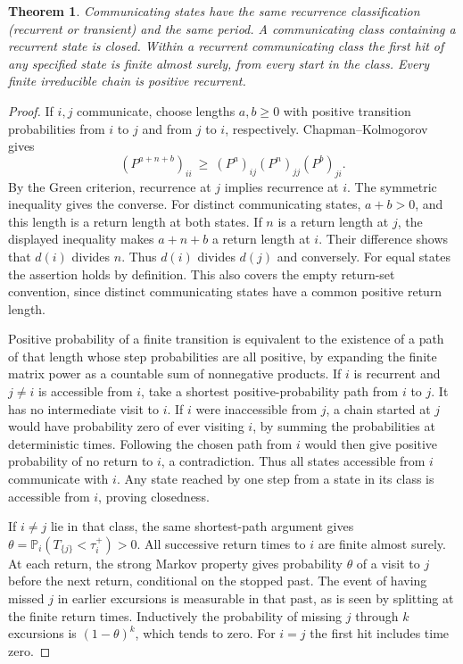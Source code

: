 \documentclass[11pt,oneside,openany]{book}
\theoremstyle{plain}
\newtheorem{theorem}{Theorem}[chapter]
\theoremstyle{definition}
\theoremstyle{remark}
\begin{document}
\begin{theorem}
Communicating states have the same recurrence classification
(recurrent or transient) and the same period. A communicating class
containing a recurrent state is closed. Within a recurrent
communicating class the first hit of any specified state is finite
almost surely, from every start in the class. Every finite
irreducible chain is positive recurrent.
\end{theorem}
\begin{proof}
If \(i,j\) communicate, choose lengths \(a,b\ge0\) with positive
transition probabilities from \(i\) to \(j\) and from \(j\) to \(i\),
respectively. Chapman--Kolmogorov gives
\[
 (P^{a+n+b})_{ii}\ \ge\ (P^a)_{ij}(P^n)_{jj}(P^b)_{ji}.
\]
By the Green criterion, recurrence at \(j\) implies recurrence at
\(i\). The symmetric inequality gives the converse.
For distinct communicating states, \(a+b>0\), and this length is
a return length at both states. If \(n\) is a return length at \(j\),
the displayed inequality makes \(a+n+b\) a return length at \(i\).
Their difference shows that \(d(i)\) divides \(n\). Thus \(d(i)\)
divides \(d(j)\) and conversely. For equal states the assertion
holds by definition. This also covers the empty return-set
convention, since distinct communicating states have a common
positive return length.

Positive probability of a finite transition is equivalent to the
existence of a path of that length whose step probabilities are all
positive, by expanding the finite matrix power as a countable sum
of nonnegative products. If \(i\) is recurrent and \(j\ne i\) is
accessible from \(i\), take a shortest positive-probability path
from \(i\) to \(j\). It has no intermediate visit to \(i\).
If \(i\) were inaccessible from \(j\), a chain started at \(j\)
would have probability zero of ever visiting \(i\), by summing the
probabilities at deterministic times. Following the chosen path
from \(i\) would then give positive probability of no return to \(i\),
a contradiction. Thus all states accessible from \(i\) communicate
with \(i\). Any state reached by one step from a state in its class
is accessible from \(i\), proving closedness.

If \(i\ne j\) lie in that class, the same shortest-path argument
gives \(\theta=\mathbb P_i(T_{\{j\}}<\tau_i^+)>0\).
All successive return times to \(i\) are finite almost surely.
At each return, the strong Markov property gives probability
\(\theta\) of a visit to \(j\) before the next return, conditional
on the stopped past. The event of having missed \(j\) in earlier
excursions is measurable in that past, as is seen by splitting
at the finite return times. Inductively the probability of missing
\(j\) through \(k\) excursions is \((1-\theta)^k\), which tends
to zero. For \(i=j\) the first hit includes time zero.


\end{proof}
\end{document}
